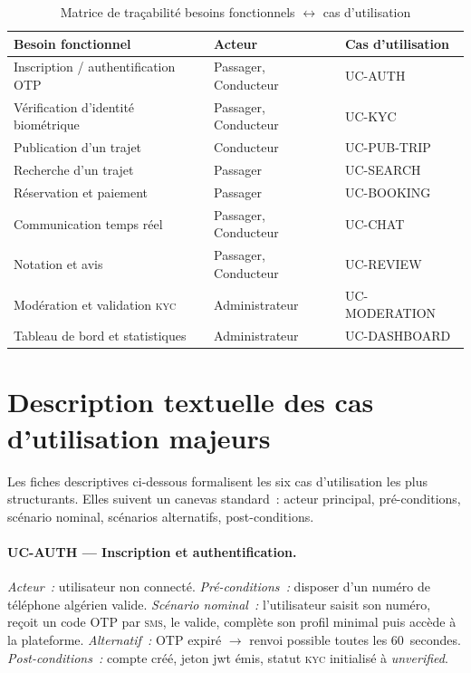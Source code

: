 \documentclass[12pt, a4paper, oneside]{report}
\begin{document}
\begin{table}[H]
\centering
\footnotesize
\begin{tabularx}{\textwidth}{|X|l|l|}
\hline
\rowcolor{rohlight}
\textbf{Besoin fonctionnel} & \textbf{Acteur} & \textbf{Cas d'utilisation} \\
\hline
Inscription / authentification OTP & Passager, Conducteur & UC-AUTH \\
\hline
Vérification d'identité biométrique & Passager, Conducteur & UC-KYC \\
\hline
Publication d'un trajet & Conducteur & UC-PUB-TRIP \\
\hline
Recherche d'un trajet & Passager & UC-SEARCH \\
\hline
Réservation et paiement & Passager & UC-BOOKING \\
\hline
Communication temps réel & Passager, Conducteur & UC-CHAT \\
\hline
Notation et avis & Passager, Conducteur & UC-REVIEW \\
\hline
Modération et validation \textsc{kyc} & Administrateur & UC-MODERATION \\
\hline
Tableau de bord et statistiques & Administrateur & UC-DASHBOARD \\
\hline
\end{tabularx}
  \caption{Matrice de traçabilité besoins fonctionnels $\leftrightarrow$ cas d'utilisation}
  \label{tab:tracabilite}
\end{table}

\section{Description textuelle des cas d'utilisation majeurs}
\label{sec:cu-textuel}

Les fiches descriptives ci-dessous formalisent les six cas d'utilisation les plus structurants. Elles suivent un canevas standard~: acteur principal, pré-conditions, scénario nominal, scénarios alternatifs, post-conditions.

\paragraph{UC-AUTH --- Inscription et authentification.}
\textit{Acteur~:} utilisateur non connecté.
\textit{Pré-conditions~:} disposer d'un numéro de téléphone algérien valide.
\textit{Scénario nominal~:} l'utilisateur saisit son numéro, reçoit un code OTP par \textsc{sms}, le valide, complète son profil minimal puis accède à la plateforme.
\textit{Alternatif~:} OTP expiré $\to$ renvoi possible toutes les 60~secondes.
\textit{Post-conditions~:} compte créé, jeton \gls{jwt} émis, statut \textsc{kyc} initialisé à \textit{unverified}.
\end{document}
